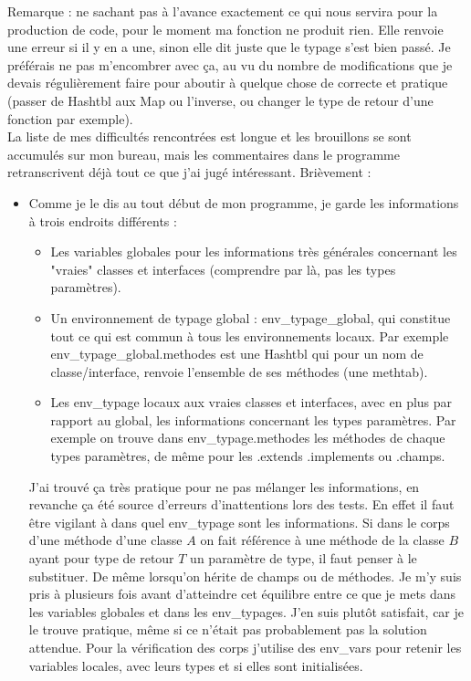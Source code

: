 \documentclass[12pt,a4paper]{report}
\begin{document}
Remarque : ne sachant pas à l'avance exactement ce qui nous servira pour la production de code, pour le moment ma fonction ne produit rien. Elle renvoie une erreur si il y en a une, sinon elle dit juste que le typage s'est bien passé. Je préférais ne pas m'encombrer avec ça, au vu du nombre de modifications que je devais régulièrement faire pour aboutir à quelque chose de correcte et pratique (passer de Hashtbl aux Map ou l'inverse, ou changer le type de retour d'une fonction par exemple). \\ 

La liste de mes difficultés rencontrées est longue et les brouillons se sont accumulés sur mon bureau, mais les commentaires dans le programme retranscrivent déjà tout ce que j'ai jugé intéressant. Brièvement :
\begin{itemize}
\item Comme je le dis au tout début de mon programme, je garde les informations à trois endroits différents : 
\begin{itemize}
\item Les variables globales pour les informations très générales concernant les "vraies" classes et interfaces (comprendre par là, pas les types paramètres).
\item Un environnement de typage global : env\_typage\_global, qui constitue tout ce qui est commun à tous les environnements locaux. Par exemple env\_typage\_global.methodes est une Hashtbl qui pour un nom de classe/interface, renvoie l'ensemble de ses méthodes (une methtab).
\item Les env\_typage locaux aux vraies classes et interfaces, avec en plus par rapport au global, les informations concernant les types paramètres. Par exemple on trouve dans env\_typage.methodes les méthodes de chaque types paramètres, de même pour les .extends .implements ou .champs.
\end{itemize}
J'ai trouvé ça très pratique pour ne pas mélanger les informations, en revanche ça été source d'erreurs d'inattentions lors des tests. En effet il faut être vigilant à dans quel env\_typage sont les informations. Si dans le corps d'une méthode d'une classe $A$ on fait référence à une méthode de la classe $B$ ayant pour type de retour $T$ un paramètre de type, il faut penser à le substituer. De même lorsqu'on hérite de champs ou de méthodes. Je m'y suis pris à plusieurs fois avant d'atteindre cet équilibre entre ce que je mets dans les variables globales et dans les env\_typages. J'en suis plutôt satisfait, car je le trouve pratique, même si ce n'était pas probablement pas la solution attendue. Pour la vérification des corps j'utilise des env\_vars pour retenir les variables locales, avec leurs types et si elles sont initialisées.

\end{itemize}
\end{document}
